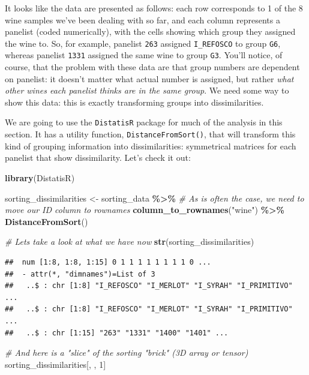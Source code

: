 \documentclass[
]{book}
\newenvironment{Shaded}{\begin{snugshade}}{\end{snugshade}}
\newcommand{\CommentTok}[1]{\textcolor[rgb]{0.56,0.35,0.01}{\textit{#1}}}
\newcommand{\DecValTok}[1]{\textcolor[rgb]{0.00,0.00,0.81}{#1}}
\newcommand{\FunctionTok}[1]{\textcolor[rgb]{0.13,0.29,0.53}{\textbf{#1}}}
\newcommand{\NormalTok}[1]{#1}
\newcommand{\OtherTok}[1]{\textcolor[rgb]{0.56,0.35,0.01}{#1}}
\newcommand{\SpecialCharTok}[1]{\textcolor[rgb]{0.81,0.36,0.00}{\textbf{#1}}}
\newcommand{\StringTok}[1]{\textcolor[rgb]{0.31,0.60,0.02}{#1}}
\begin{document}
It looks like the data are presented as follows: each row corresponds to 1 of the 8 wine samples we've been dealing with so far, and each column represents a panelist (coded numerically), with the cells showing which group they assigned the wine to. So, for example, panelist \texttt{263} assigned \texttt{I\_REFOSCO} to group \texttt{G6}, whereas panelist \texttt{1331} assigned the same wine to group \texttt{G3}. You'll notice, of course, that the problem with these data are that group numbers are dependent on panelist: it doesn't matter what actual number is assigned, but rather \emph{what other wines each panelist thinks are in the same group}. We need some way to show this data: this is exactly transforming groups into dissimilarities.

We are going to use the \texttt{DistatisR} package for much of the analysis in this section. It has a utility function, \texttt{DistanceFromSort()}, that will transform this kind of grouping information into dissimilarities: symmetrical matrices for each panelist that show dissimilarity. Let's check it out:

\begin{Shaded}
\begin{Highlighting}[]
\FunctionTok{library}\NormalTok{(DistatisR)}

\NormalTok{sorting\_dissimilarities }\OtherTok{\textless{}{-}} 
\NormalTok{  sorting\_data }\SpecialCharTok{\%\textgreater{}\%}
  \CommentTok{\# As is often the case, we need to move our ID column to \textasciigrave{}rownames\textasciigrave{}}
  \FunctionTok{column\_to\_rownames}\NormalTok{(}\StringTok{"wine"}\NormalTok{) }\SpecialCharTok{\%\textgreater{}\%}
  \FunctionTok{DistanceFromSort}\NormalTok{()}

\CommentTok{\# Let\textquotesingle{}s take a look at what we have now}
\FunctionTok{str}\NormalTok{(sorting\_dissimilarities)}
\end{Highlighting}
\end{Shaded}

\begin{verbatim}
##  num [1:8, 1:8, 1:15] 0 1 1 1 1 1 1 1 1 0 ...
##  - attr(*, "dimnames")=List of 3
##   ..$ : chr [1:8] "I_REFOSCO" "I_MERLOT" "I_SYRAH" "I_PRIMITIVO" ...
##   ..$ : chr [1:8] "I_REFOSCO" "I_MERLOT" "I_SYRAH" "I_PRIMITIVO" ...
##   ..$ : chr [1:15] "263" "1331" "1400" "1401" ...
\end{verbatim}

\begin{Shaded}
\begin{Highlighting}[]
\CommentTok{\# And here is a "slice" of the sorting "brick" (3D array or tensor)}
\NormalTok{sorting\_dissimilarities[, , }\DecValTok{1}\NormalTok{]}
\end{Highlighting}
\end{Shaded}
\end{document}

